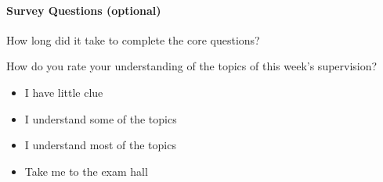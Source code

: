 \documentclass{exam}
\begin{document}
\paragraph{Survey Questions (optional)}
\begin{questions}
\question How long did it take to complete the core questions?
 
\question How do you rate your understanding of the topics of this week's supervision?

\begin{itemize}
\item
I have little clue
\item 
I understand some of the topics
\item
I understand most of the topics
\item
Take me to the exam hall
\end{itemize}
\end{questions}
\end{document}
